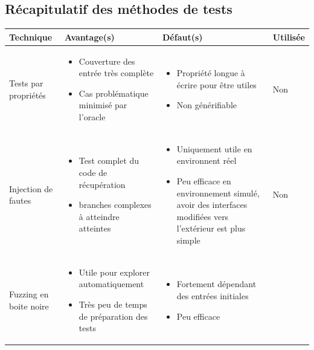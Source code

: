 \documentclass[a4paper]{report}
\begin{document}
\begin{landscape}
	\section{Récapitulatif des méthodes de tests}
	\begin{tabularx}{1\linewidth}{>{\centering}p{}||p{}|p{}|p{}}
	Technique & Avantage(s) & Défaut(s) & 
	Utilisée  \\
	\hline 
	\hline   
	Tests par propriétés & 
	\begin{itemize}
	\item Couverture des entrée très complète
	\item Cas problématique minimisé par l'oracle
	\end{itemize}
	 &
	\begin{itemize}
	\item Propriété longue à écrire pour être utiles
	\item Non générifiable
	\end{itemize}
	 & Non \\ 
	\hline   
	Injection de fautes &
	\begin{itemize}
	\item Test complet du code de récupération
	\item branches complexes à atteindre atteintes
	\end{itemize}
	 &
	\begin{itemize}
	\item Uniquement utile en environnent réel
	\item Peu efficace en environnement simulé, avoir des interfaces modifiées vers l'extérieur est plus simple
	\end{itemize}
	 & Non \\ 
	\hline   
	Fuzzing en boite noire &
	\begin{itemize}
	\item Utile pour explorer  automatiquement
	\item Très peu de temps de préparation des tests
	\end{itemize}
	 & 
	\begin{itemize}
	\item Fortement dépendant des entrées initiales
	\item Peu efficace

\end{itemize}
\end{tabularx}
\end{landscape}
\end{document}
